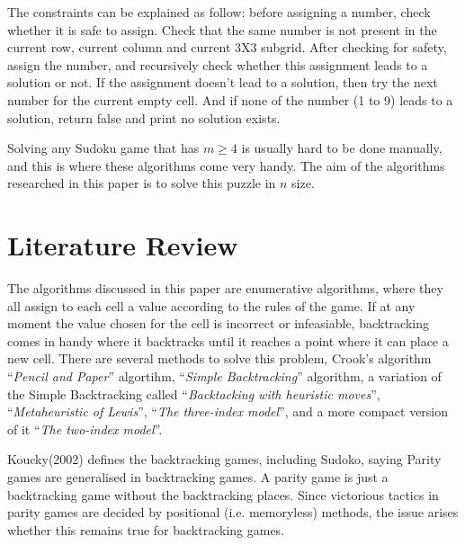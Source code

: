 \documentclass[12pt]{extarticle}
\theoremstyle{plain}
\begin{document}
\noindent The constraints can be explained as follow: before assigning a number, check whether it is safe to assign. Check that the same number is not present in the current row, current column and current 3X3 subgrid. After checking for safety, assign the number, and recursively check whether this assignment leads to a solution or not. If the assignment doesn’t lead to a solution, then try the next number for the current empty cell. And if none of the number (1 to 9) leads to a solution, return false and print no solution exists.

Solving any Sudoku game that has $m \geq 4$ is usually hard to be done manually, and this is where these algorithms come very handy.
The aim of the algorithms researched in this paper is to solve this puzzle in $n$ size.

\newpage

\section*{Literature Review}

The algorithms discussed in this paper are enumerative algorithms, where they all assign to each cell a value according to the rules of the game.
If at any moment the value chosen for the cell is incorrect or infeasiable, backtracking comes in handy where it backtracks until it reaches a point where it can
place a new cell.
There are several methods to solve this problem, Crook's algorithm ``\textit{Pencil and Paper}'' algortihm, ``\textit{Simple Backtracking}'' algorithm, a variation of the Simple Backtracking called ``\textit{Backtacking with heuristic moves}'',
``\textit{Metaheuristic of Lewis}'', ``\textit{The three-index model}'', and a more compact version of it ``\textit{The two-index model}''.

Koucky(2002) defines the backtracking games, including Sudoko, saying Parity games are generalised in backtracking games. A parity game is just a backtracking game without the backtracking places. Since victorious tactics in parity games are decided by positional (i.e. memoryless) methods, the issue arises whether this remains true for backtracking games.
\end{document}
